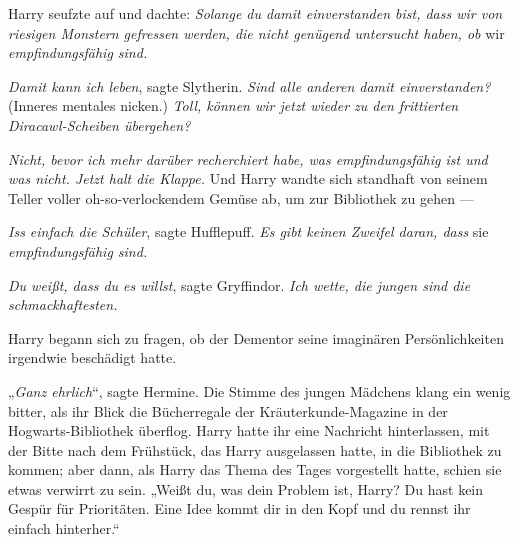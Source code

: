 Harry seufzte auf und dachte: \emph{Solange du damit einverstanden bist, dass wir von riesigen Monstern gefressen werden, die nicht genügend untersucht haben, ob} wir \emph{empfindungsfähig sind.}

\emph{Damit kann ich leben}, sagte Slytherin. \emph{Sind alle anderen damit einverstanden?} (Inneres mentales nicken.) \emph{Toll, können wir jetzt wieder zu den frittierten} \emph{Diracawl-Scheiben übergehen?}

\emph{Nicht, bevor ich mehr darüber recherchiert habe, was empfindungsfähig ist und was nicht. Jetzt halt die Klappe.} Und Harry wandte sich standhaft von seinem Teller voller oh-so-verlockendem Gemüse ab, um zur Bibliothek zu gehen —

\emph{Iss einfach die Schüler}, sagte Hufflepuff. \emph{Es gibt keinen Zweifel daran, dass} sie \emph{empfindungsfähig sind.}

\emph{Du weißt, dass du es willst}, sagte Gryffindor. \emph{Ich wette, die jungen sind die schmackhaftesten.}

Harry begann sich zu fragen, ob der Dementor seine imaginären Persönlichkeiten irgendwie beschädigt hatte.

\later

„\emph{Ganz ehrlich}“, sagte Hermine. Die Stimme des jungen Mädchens klang ein wenig bitter, als ihr Blick die Bücherregale der Kräuterkunde-Magazine in der Hogwarts-Bibliothek überflog. Harry hatte ihr eine Nachricht hinterlassen, mit der Bitte nach dem Frühstück, das Harry ausgelassen hatte, in die Bibliothek zu kommen; aber dann, als Harry das Thema des Tages vorgestellt hatte, schien sie etwas verwirrt zu sein.
„Weißt du, was dein Problem ist, Harry? Du hast kein Gespür für Prioritäten. Eine Idee kommt dir in den Kopf und du rennst ihr einfach hinterher.“

